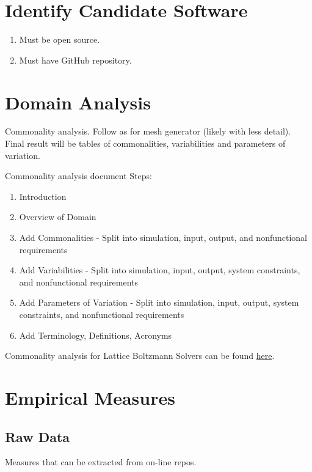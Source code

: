 \documentclass[letterpaper,cleveref]{lipics-v2019}
\theoremstyle{definition}
\begin{document}
\section{Identify Candidate Software} \label{SecIdentifyCandSoft}

\begin{enumerate}
\item Must be open source.
\item Must have GitHub repository.
\end{enumerate}

\section{Domain Analysis} \label{SecDomainAnalysis}

Commonality analysis.  Follow as for mesh generator (likely with less detail).
Final result will be tables of commonalities, variabilities and parameters of
variation.

Commonality analysis document Steps:
\begin{enumerate}
\item Introduction
\item Overview of Domain
\item Add Commonalities - Split into simulation, input, output, and
  nonfunctional requirements
\item Add Variabilities - Split into simulation, input, output, system
  constraints, and nonfunctional requirements
\item Add Parameters of Variation - Split into simulation, input, output, system
  constraints, and nonfunctional requirements
\item Add Terminology, Definitions, Acronyms
\end{enumerate}

Commonality analysis for Lattice Boltzmann Solvers can be found
\href{run:../Peter-Notes/Commonality-Analysis-LB-Systems.pdf}{here}.

\section{Empirical Measures}

\subsection{Raw Data}
Measures that can be extracted from on-line repos.
\end{document}

